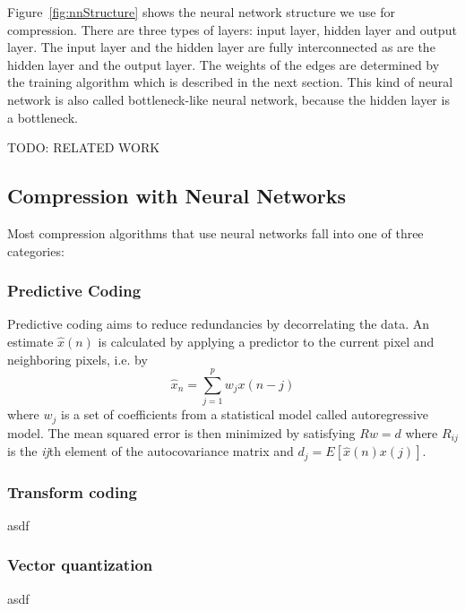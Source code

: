 Figure~\ref{fig:nnStructure} shows the neural network structure we use for compression. There are three types of layers: input layer, hidden layer and output layer. The input layer and the hidden layer are fully interconnected as are the hidden layer and the output layer. The weights of the edges are determined by the training algorithm which is described in the next section. This kind of neural network is also called bottleneck-like neural network, because the hidden layer is a bottleneck.

{\color{red} TODO: RELATED WORK}

\subsection{Compression with Neural Networks}

Most compression algorithms that use neural networks fall into one of three categories\cite{Dony1995}: 

\subsubsection{Predictive Coding}
Predictive coding aims to reduce redundancies by decorrelating the data. An estimate \(\hat{x}(n)\) is calculated by applying a predictor to the current pixel and neighboring pixels, i.e. by
\begin{equation}
\hat{x}_n = \sum_{j=1}^{p} w_j x(n-j)
\end{equation}
where \({w_j}\) is a set of coefficients from a statistical model called autoregressive model. The mean squared error is then minimized by satisfying \(Rw = d\) where \(R_{ij}\) is the \emph{ij}th element of the autocovariance matrix and \(d_j = E[\hat{x}(n)x(j)]\).
\subsubsection{Transform coding}
asdf

\subsubsection{Vector quantization}
asdf
